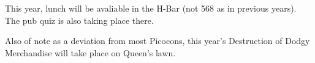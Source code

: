 This year, lunch will be avaliable in the H-Bar (not 568 as in previous years). The pub quiz is also taking place there. 

Also of note as a deviation from most Picocons, this year's Destruction of Dodgy Merchandise will take place on Queen's lawn. 



